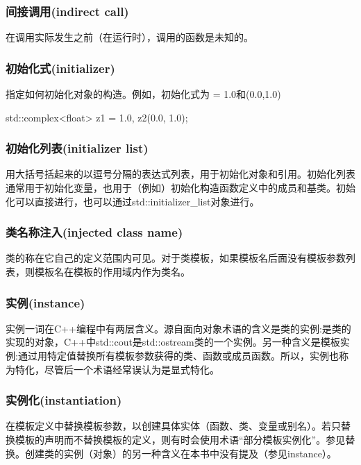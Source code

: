 \subsubsection{间接调用(indirect call)}

在调用实际发生之前（在运行时），调用的函数是未知的。

\subsubsection{初始化式(initializer)}

指定如何初始化对象的构造。例如，初始化式为 = 1.0和(0.0,1.0)
\begin{cpp}
std::complex<float> z1 = 1.0, z2(0.0, 1.0);
\end{cpp}

\subsubsection{初始化列表(initializer list)}

用大括号括起来的以逗号分隔的表达式列表，用于初始化对象和引用。初始化列表通常用于初始化变量，也用于（例如）初始化构造函数定义中的成员和基类。初始化可以直接进行，也可以通过std::initializer\_list对象进行。

\subsubsection{类名称注入(injected class name)}

类的称在它自己的定义范围内可见。对于类模板，如果模板名后面没有模板参数列表，则模板名在模板的作用域内作为类名。

\subsubsection{实例(instance)}

实例一词在C++编程中有两层含义。源自面向对象术语的含义是类的实例:是类的实现的对象，C++中std::cout是std::ostream类的一个实例。另一种含义是模板实例:通过用特定值替换所有模板参数获得的类、函数或成员函数。所以，实例也称为特化，尽管后一个术语经常误认为是显式特化。

\subsubsection{实例化(instantiation)}

在模板定义中替换模板参数，以创建具体实体（函数、类、变量或别名）。若只替换模板的声明而不替换模板的定义，则有时会使用术语“部分模板实例化”。参见替换。创建类的实例（对象）的另一种含义在本书中没有提及（参见instance）。

